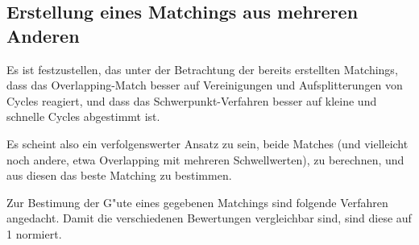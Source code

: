 \subsection{Erstellung eines Matchings aus mehreren Anderen}\label{bewertung}


Es ist festzustellen, das unter der Betrachtung der bereits erstellten Matchings, dass das Overlapping-Match besser auf Vereinigungen und Aufsplitterungen von Cycles reagiert, und dass das Schwerpunkt-Verfahren besser auf kleine und schnelle Cycles abgestimmt ist. 

Es scheint also ein verfolgenswerter Ansatz zu sein, beide Matches (und vielleicht noch andere, etwa Overlapping mit mehreren Schwellwerten), zu berechnen, und aus diesen das beste Matching zu bestimmen. 

Zur Bestimung der G"ute eines gegebenen Matchings sind folgende Verfahren angedacht. Damit die verschiedenen Bewertungen vergleichbar sind, sind diese auf 1 normiert.

